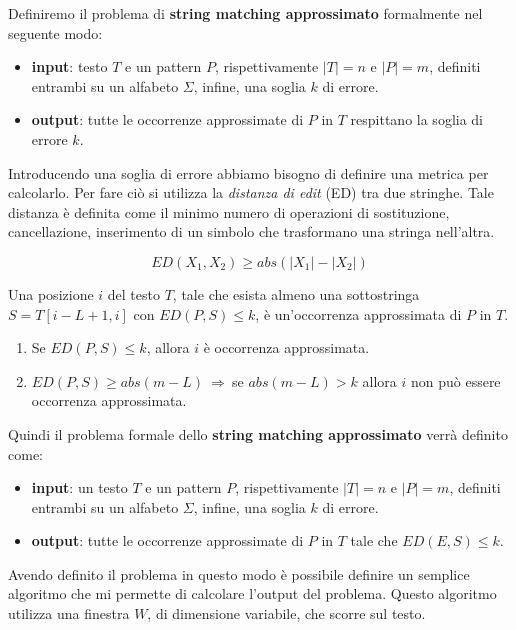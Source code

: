Definiremo il problema di \textbf{string matching approssimato} formalmente nel seguente modo:
\begin{itemize}
    \item \textbf{input}: testo $T$ e un pattern $P$, rispettivamente $|T|=n$ e $|P|=m$, definiti entrambi su un alfabeto $\Sigma$, infine, una soglia $k$ di errore. 
    \item \textbf{output}: tutte le occorrenze approssimate di $P$ in $T$ respittano la soglia di errore $k$.
\end{itemize}
Introducendo una soglia di errore abbiamo bisogno di definire una metrica per calcolarlo. Per fare ciò si utilizza la \textit{distanza di edit} (ED) tra due stringhe. Tale distanza è definita come il minimo numero di operazioni di sostituzione, cancellazione, inserimento di un simbolo che trasformano una stringa nell'altra.
\begin{nota}
    \begin{equation}
        ED(X_1, X_2) \geq abs(|X_1| - |X_2|)
    \end{equation}
\end{nota}
\begin{definizione}
    Una posizione $i$ del testo $T$, tale che esista almeno una sottostringa $S = T[i - L + 1,i]$ con $ED(P, S) \leq k$, è un'occorrenza approssimata di $P$ in $T$.
\end{definizione}
\begin{nota}
    \begin{enumerate}
        \item Se $ED(P, S) \leq k$, allora $i$ è occorrenza approssimata.
        \item $ED(P, S) \geq abs(m - L) \ \Rightarrow \ $se $abs(m - L) > k$ allora $i$ non può essere occorrenza approssimata. 
    \end{enumerate}
\end{nota}
Quindi il problema formale dello \textbf{string matching approssimato} verrà definito come:
\begin{itemize}
	\item \textbf{input}: un testo $T$ e un pattern $P$, rispettivamente $|T|=n$ e $|P|=m$, definiti entrambi su un alfabeto $\Sigma$, infine, una soglia $k$ di errore. 
	\item \textbf{output}: tutte le occorrenze approssimate di $P$ in $T$ tale che  $ED(E,S)\le k$.
\end{itemize}
Avendo definito il problema in questo modo è possibile definire un semplice algoritmo che mi permette di calcolare l'output del problema. Questo algoritmo utilizza una finestra $W$, di dimensione variabile, che scorre sul testo.
